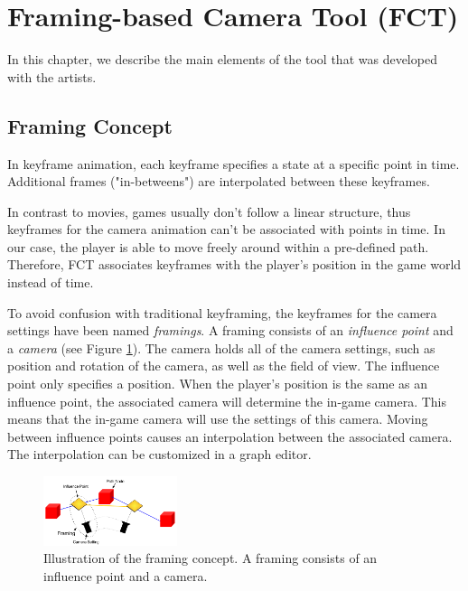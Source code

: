 \section{Framing-based Camera Tool (FCT)}
In this chapter, we describe the main elements of the tool that was developed with the artists.

\subsection{Framing Concept}
In keyframe animation, each keyframe specifies a state at a specific point in time. Additional frames ("in-betweens") are interpolated between these keyframes.



In contrast to movies, games usually don't follow a linear structure, thus keyframes for the camera animation can't be associated with points in time. In our case, the player is able to move freely around within a pre-defined path. Therefore, FCT associates keyframes with the player's position in the game world instead of time.



To avoid confusion with traditional keyframing, the keyframes for the camera settings have been named \textit{framings}. A framing consists of an \textit{influence point} and a \textit{camera} (see Figure \ref{fig:framingConceptNew}). The camera holds all of the camera settings, such as position and rotation of the camera, as well as the field of view. The influence point only specifies a position. When the player's position is the same as an influence point, the associated camera will determine the in-game camera. This means that the in-game camera will use the settings of this camera. Moving between influence points causes an interpolation between the associated camera. The interpolation can be customized in a graph editor.

\begin{figure}[htbp]
\centering
\includegraphics[width=0.35\textwidth]{Pics/Instructions}
\caption{Illustration of the framing concept. A framing consists of an influence point and a camera.}
\label{fig:framingConceptNew}
\end{figure}


